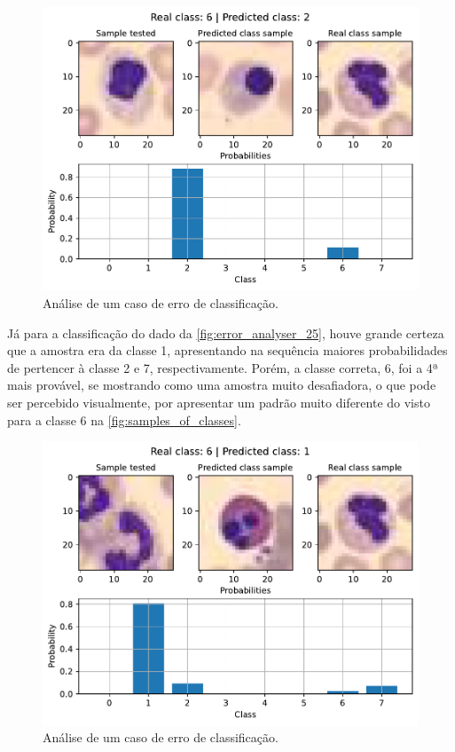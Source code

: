 \begin{figure}[H]
\centering
\includegraphics[width=0.75\linewidth]{../../plot/mlp/error_analyser_62}
\caption{Análise de um caso de erro de classificação.}
\label{fig:error_analyser_62}
\end{figure}

Já para a classificação do dado da \autoref{fig:error_analyser_25}, houve grande certeza que a amostra era da classe 1, apresentando na sequência maiores probabilidades de pertencer à classe 2 e 7, respectivamente. Porém, a classe correta, 6, foi a 4ª mais provável, se mostrando como uma amostra muito desafiadora, o que pode ser percebido visualmente, por apresentar um padrão muito diferente do visto para a classe 6 na \autoref{fig:samples_of_classes}.

\begin{figure}[H]
\centering
\includegraphics[width=0.75\linewidth]{../../plot/mlp/error_analyser_25}
\caption{Análise de um caso de erro de classificação.}
\label{fig:error_analyser_25}
\end{figure}




